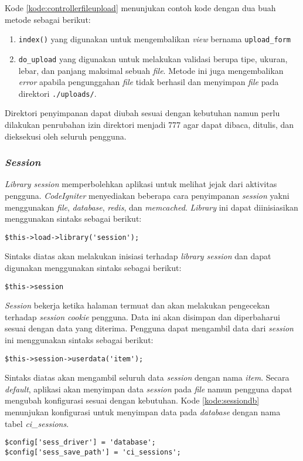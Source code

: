 Kode \ref{kode:controllerfileupload} menunjukan contoh kode dengan dua buah metode sebagai berikut:
\begin{enumerate}
\item \verb|index()| yang digunakan untuk mengembalikan \textit{view} bernama \texttt{upload\_form}
\item \verb|do_upload| yang digunakan untuk melakukan validasi berupa tipe, ukuran, lebar, dan panjang maksimal sebuah \textit{file}. Metode ini juga mengembalikan \textit{error} apabila pengunggahan \textit{file} tidak berhasil dan menyimpan \textit{file} pada direktori \texttt{./uploads/}.
\end{enumerate}
Direktori penyimpanan dapat diubah sesuai dengan kebutuhan namun perlu dilakukan penrubahan izin direktori menjadi 777 agar dapat dibaca, ditulis, dan dieksekusi oleh seluruh pengguna.

\subsubsection{\textit{Session}}
\textit{Library session} memperbolehkan aplikasi untuk melihat jejak dari aktivitas pengguna. \textit{CodeIgniter} menyediakan beberapa cara penyimpanan \textit{session} yakni menggunakan \textit{file}, \textit{database}, \textit{redis}, dan \textit{memcached}. \textit{Library} ini dapat diinisiasikan menggunakan sintaks sebagai berikut:
\begin{center}
	\verb|$this->load->library('session');|
\end{center}
Sintaks diatas akan melakukan inisiasi terhadap \textit{library session} dan dapat digunakan menggunakan sintaks sebagai berikut:
\begin{center}
	\verb|$this->session|
\end{center}
\textit{Session} bekerja ketika halaman termuat dan akan melakukan pengecekan terhadap \textit{session cookie} pengguna. Data ini akan disimpan dan diperbaharui sesuai dengan  data yang diterima. Pengguna dapat mengambil data dari \textit{session} ini menggunakan sintaks sebagai berikut:
\begin{center}
	\verb|$this->session->userdata('item');|
\end{center}
Sintaks diatas akan mengambil seluruh data \textit{session} dengan nama \textit{item}. Secara \textit{default}, aplikasi akan menyimpan data \textit{session} pada \textit{file} namun pengguna dapat mengubah konfigurasi sesuai dengan kebutuhan. Kode \ref{kode:sessiondb} menunjukan konfigurasi untuk menyimpan data pada \textit{database} dengan nama tabel \textit{ci\_sessions}.
\begin{lstlisting}[caption=Contoh konfigurasi untuk menyimpan data pada \textit{database}, label=kode:sessiondb]
$config['sess_driver'] = 'database';
$config['sess_save_path'] = 'ci_sessions';
\end{lstlisting}


